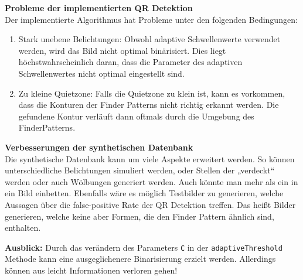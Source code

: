 \textbf{Probleme der implementierten QR Detektion} \\
Der implementierte Algorithmus hat Probleme unter den folgenden Bedingungen:
\begin{enumerate}
\item Stark unebene Belichtungen: Obwohl adaptive Schwellenwerte verwendet werden, wird das Bild nicht optimal binärisiert. Dies liegt höchstwahrscheinlich daran, dass die Parameter des adaptiven Schwellenwertes nicht optimal eingestellt sind. 

\item Zu kleine Quietzone: Falls die Quietzone zu klein ist, kann es vorkommen, dass die Konturen der Finder Patterns nicht richtig erkannt werden. Die gefundene Kontur verläuft dann oftmals durch die Umgebung des FinderPatterns.
\end{enumerate}

\textbf{Verbesserungen der synthetischen Datenbank}\\
Die synthetische Datenbank kann um viele Aspekte erweitert werden. So können unterschiedliche Belichtungen simuliert werden, oder Stellen der \QRCodes „verdeckt“ werden oder auch Wölbungen generiert werden. Auch könnte man mehr als ein \QRCode in ein Bild einbetten.
Ebenfalls wäre es möglich Testbilder zu generieren, welche Aussagen über die false-positive Rate der QR Detektion treffen. Das heißt Bilder generieren, welche keine \QRCodes aber Formen, die den Finder Pattern ähnlich sind, enthalten.



\textbf{Ausblick:} Durch das verändern des Parameters \texttt{C} in der \texttt{adaptiveThreshold} Methode kann eine ausgeglichenere Binarisierung erzielt werden. Allerdings können aus leicht Informationen verloren gehen!

